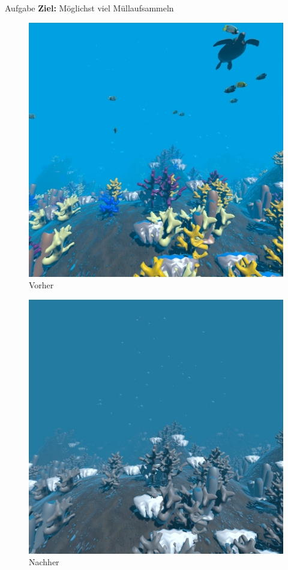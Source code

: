 \documentclass{beamer}
\begin{document}
\begin{frame}{Aufgabe}
\textbf{Ziel:} Möglichst viel Müllaufsammeln\\
\begin{minipage}[c]{0.49\textwidth}
\begin{figure}
\centering
\includegraphics[width=\textwidth, keepaspectratio]{img/Vorher_Bild}
\caption{Vorher}
\end{figure}
\end{minipage}
\hfill
\begin{minipage}[c]{0.49\textwidth}
\begin{figure}
\centering
\includegraphics[width=\textwidth, keepaspectratio]{img/Nachher_Bild}
\caption{Nachher}
\end{figure}
\end{minipage}
\end{frame}
\end{document}
